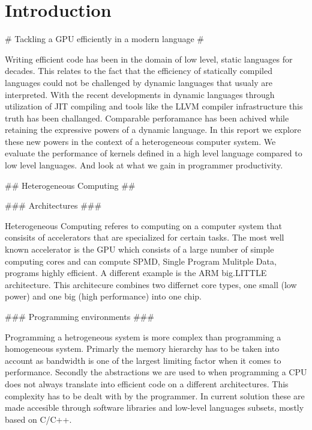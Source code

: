 
\chapter{Introduction}





\begin{markdown}
# Tackling a GPU efficiently in a modern language #

Writing efficient code has been in the domain of low level, static
languages for decades. This relates to the fact that the efficiency of
statically compiled languages could not be challenged by dynamic
languages that usualy are interpreted.  With the recent developments
in dynamic languages through utilization of \gls{JIT} compiling and
tools like the \gls{LLVM} compiler infrastructure this truth has been
challanged. Comparable perforamance has been achived while retaining
the expressive powers of a dynamic language. In this report we explore
these new powers in the context of a heterogeneous computer system. We
evaluate the performance of kernels defined in a high level language
compared to low level languages. And look at what we gain in
programmer productivity.

## Heterogeneous Computing ##

### Architectures ###

Heterogeneous Computing referes to computing on a computer system that
consisits of accelerators that are specialized for certain tasks. The
most well known accelerator is the \gls{GPU} which consists of a large
number of simple computing cores and can compute SPMD, Single Program
Mulitple Data, programs highly efficient. A different example is the
ARM big.LITTLE \cite{big.little} architecture. This architecure
combines two differnet core types, one small (low power) and one big
(high performance) into one chip.

### Programming environments ###

Programming a hetrogeneous system is more complex than programming a
homogeneous system. Primarly the memory hierarchy has to be taken into
account as bandwidth is one of the largest limiting factor when it
comes to performance. Secondly the abstractions we are used to when
programming a CPU does not always translate into efficient code on a
different architectures. This complexity has to be dealt with by the
programmer. In current solution these are made accesible through
software libraries and low-level languages subsets, mostly based on
C/C++.


\end{markdown}
